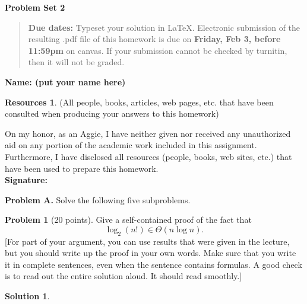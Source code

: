 \documentclass{article}
\theoremstyle{definition}
\newtheorem{problem}{Problem}
\newtheorem*{solution}{Solution}
\newtheorem*{resources}{Resources}
\newcommand{\name}[1]{\noindent\textbf{Name: {#1}}}
\newcommand{\honor}{\noindent On my honor, as an Aggie, I have neither
  given nor received any unauthorized aid on any portion of the
  academic work included in this assignment. Furthermore, I have
  disclosed all resources (people, books, web sites, etc.) that have
  been used to prepare this homework. \\[1ex]
 \textbf{Signature:} \underline{\hspace*{5cm}} }
\newcommand{\problemset}[1]{\begin{center}\textbf{Problem Set #1}\end{center}}
\newcommand{\duedate}[1]{\begin{quote}\textbf{Due dates:} Typeset your
    solution in \LaTeX{}. Electronic
    submission of the resulting .pdf file of this homework is due on
    \textbf{#1} on canvas. If your submission cannot be checked by
    turnitin, then it will not be graded.\end{quote} }
\begin{document}
\problemset{2}
\duedate{Friday, Feb 3, before 11:59pm}
\name{(put your name here)}
\begin{resources} (All people, books, articles, web pages, etc. that
  have been consulted when producing your answers to this homework)
\end{resources}
\honor

\newpage

\noindent\textbf{Problem A.} Solve the following five subproblems. 

\begin{problem}[20 points] 
Give a self-contained proof of the fact that 
$$\log_2(n!)\in \Theta(n\log n).$$
[For part of your argument, you can use results that were given in the
lecture, but you should write up the proof in your own words. Make
sure that you write it in complete sentences, even when the sentence
contains formulas. A good check is to read out the entire solution
aloud. It should read smoothly.] 
\end{problem}
\begin{solution}
\end{solution}  
\end{document}
